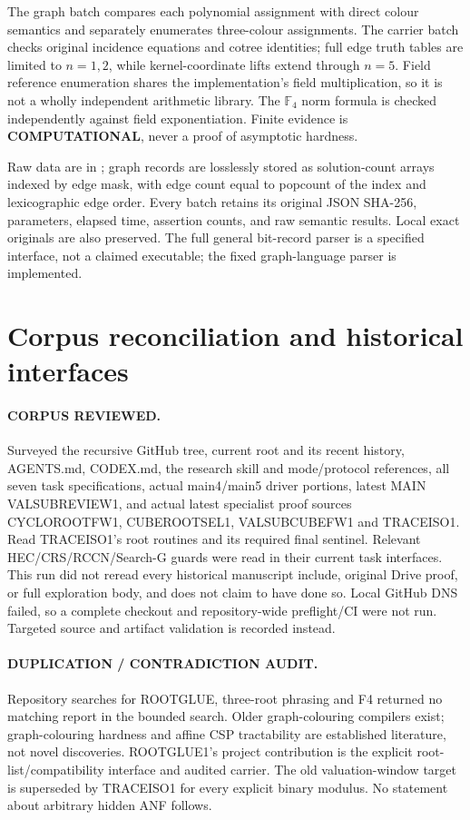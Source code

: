 \documentclass[11pt]{article}
\newcommand{\F}{\mathbb F}
\newcommand{\COMP}{\textbf{COMPUTATIONAL}}
\begin{document}
The graph batch compares each polynomial assignment with direct colour
semantics and separately enumerates three-colour assignments. The carrier
batch checks original incidence equations and cotree identities; full edge
truth tables are limited to $n=1,2$, while kernel-coordinate lifts extend
through $n=5$. Field reference enumeration shares the implementation's
field multiplication, so it is not a wholly independent arithmetic library.
The $\F_4$ norm formula is checked independently against field exponentiation.
Finite evidence is \COMP{}, never a proof of asymptotic hardness.

Raw data are in ; graph
records are losslessly stored as solution-count arrays indexed by edge mask,
with edge count equal to popcount of the index and lexicographic edge order.
Every batch retains its original JSON SHA-256, parameters, elapsed time,
assertion counts, and raw semantic results. Local exact originals are also
preserved. The full general bit-record parser is a specified interface,
not a claimed executable; the fixed graph-language parser is implemented.

\section{Corpus reconciliation and historical interfaces}
\paragraph{CORPUS REVIEWED.}
Surveyed the recursive GitHub tree, current root and its recent history,
AGENTS.md, CODEX.md, the research skill and mode/protocol references, all
seven task specifications, actual main4/main5 driver portions, latest MAIN
VALSUBREVIEW1, and actual latest specialist proof sources CYCLOROOTFW1,
CUBEROOTSEL1, VALSUBCUBEFW1 and TRACEISO1. Read TRACEISO1's root routines and
its required final sentinel. Relevant HEC/CRS/RCCN/Search-G guards were read
in their current task interfaces. This run did not reread every historical
manuscript include, original Drive proof, or full exploration body, and does
not claim to have done so. Local GitHub DNS failed, so a complete checkout
and repository-wide preflight/CI were not run. Targeted source and artifact
validation is recorded instead.

\paragraph{DUPLICATION / CONTRADICTION AUDIT.}
Repository searches for ROOTGLUE, three-root phrasing and F4 returned no
matching report in the bounded search. Older graph-colouring compilers
exist; graph-colouring hardness and affine CSP tractability are established
literature, not novel discoveries. ROOTGLUE1's project contribution is the
explicit root-list/compatibility interface and audited carrier. The old
valuation-window target is superseded by TRACEISO1 for every explicit binary
modulus. No statement about arbitrary hidden ANF follows.
\end{document}
